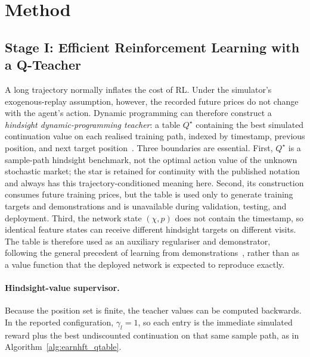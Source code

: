 \section{Method}
\label{sec:earnhft_method}

\subsection{Stage I: Efficient Reinforcement Learning with a Q-Teacher}
\label{sec:earnhft_stage1}

A long trajectory normally inflates the cost of RL. Under the simulator's exogenous-replay assumption, however, the recorded future prices do not change with the agent's action. Dynamic programming can therefore construct a \emph{hindsight dynamic-programming teacher}: a table $Q^\star$ containing the best simulated continuation value on each realised training path, indexed by timestamp, previous position, and next target position~\cite{sutton2018reinforcement}. Three boundaries are essential. First, $Q^\star$ is a sample-path hindsight benchmark, not the optimal action value of the unknown stochastic market; the star is retained for continuity with the published notation and always has this trajectory-conditioned meaning here. Second, its construction consumes future training prices, but the table is used only to generate training targets and demonstrations and is unavailable during validation, testing, and deployment. Third, the network state $(\chi,p)$ does not contain the timestamp, so identical feature states can receive different hindsight targets on different visits. The table is therefore used as an auxiliary regulariser and demonstrator, following the general precedent of learning from demonstrations~\cite{hester2018dqfd}, rather than as a value function that the deployed network is expected to reproduce exactly.

\paragraph{Hindsight-value supervisor.} Because the position set is finite, the teacher values can be computed backwards. In the reported configuration, $\gamma_l=1$, so each entry is the immediate simulated reward plus the best undiscounted continuation on that same sample path, as in Algorithm~\ref{alg:earnhft_qtable}.

